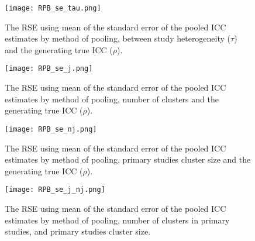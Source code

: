 

\begin{figure}[H]
    \centering
    \texttt{[image: RPB\_se\_tau.png]}
    \caption{The RSE using mean of the standard error of the pooled ICC estimates by method of pooling, between study heterogeneity ($\tau$) and the generating true ICC ($\rho$). }
    \label{fig:RPBse_tau}
\end{figure}




\begin{figure}[H]
    \centering
    \texttt{[image: RPB\_se\_j.png]}
    \caption{The RSE using mean of the standard error of the pooled ICC estimates by method of pooling, number of clusters and the generating true ICC ($\rho$). }
    \label{fig:RPBse_j}
\end{figure}




\begin{figure}[H]
    \centering
    \texttt{[image: RPB\_se\_nj.png]}
    \caption{The RSE using mean of the standard error of the pooled ICC estimates by method of pooling, primary studies cluster size and the generating true ICC ($\rho$). }
    \label{fig:RPBse_nj}
\end{figure}




\begin{figure}[H]
    \centering
    \texttt{[image: RPB\_se\_j\_nj.png]}
    \caption{The RSE using mean of the standard error of the pooled ICC estimates by method of pooling,  number of clusters in primary studies, and primary studies cluster size. }
    \label{fig:RPBse_njj}
\end{figure}


